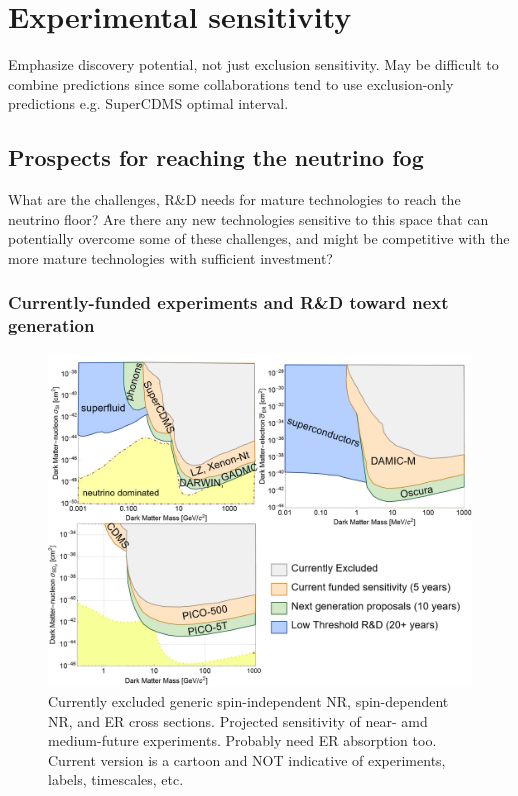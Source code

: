 \section{Experimental sensitivity}
\label{sec:experiment}

Emphasize discovery potential, not just exclusion sensitivity. May be difficult to combine predictions since some collaborations tend to use exclusion-only predictions e.g. SuperCDMS optimal interval. 

\subsection{Prospects for reaching the neutrino fog}
What are the challenges, R\&D needs for mature technologies to reach the neutrino floor?  Are there any new technologies sensitive to this space that can potentially overcome some of these challenges, and might be competitive with the more mature technologies with sufficient investment?
\subsubsection{Currently-funded experiments and R\&D toward next generation}
\label{sec:currentexperiments}

\begin{figure}
    \centering
    \includegraphics[width=\textwidth]{figures/wimp_sensitivty_cartoon.png}
    \caption{Currently excluded generic spin-independent NR, spin-dependent NR, and ER cross sections. Projected sensitivity of near- amd medium-future experiments. Probably need ER absorption too. Current version is a cartoon and NOT indicative of experiments, labels, timescales, etc.}
    \label{fig:si_sensitivity}
\end{figure}

